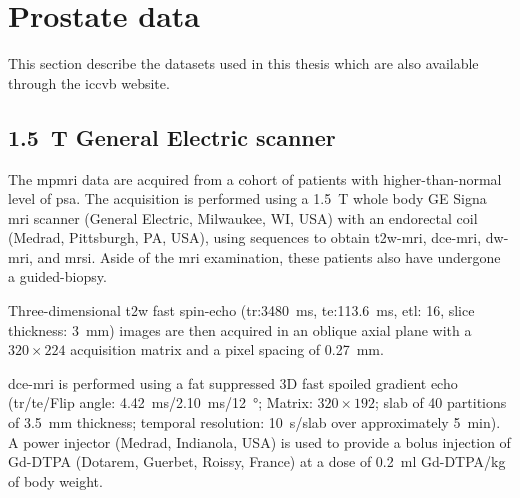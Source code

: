 \section{Prostate data}
This section describe the datasets used in this thesis which are also available through the \acs{iccvb} website.

\subsection{\SI{1.5}{\tesla} General Electric scanner}

The \ac{mpmri} data are acquired from a cohort of patients with higher-than-normal level of \ac{psa}.
The acquisition is performed using a \SI{1.5}{\tesla} whole body GE Signa \ac{mri} scanner (General Electric, Milwaukee, WI, USA) with an endorectal coil (Medrad, Pittsburgh, PA, USA), using sequences to obtain \ac{t2w}-\ac{mri}, \ac{dce}-\ac{mri}, \ac{dw}-\ac{mri}, and \ac{mrsi}.
Aside of the \ac{mri} examination, these patients also have undergone a guided-biopsy.

Three-dimensional \ac{t2w} fast spin-echo (\ac{tr}:\SI{3480}{\ms}, \ac{te}:\SI{113.6}{\ms}, \ac{etl}: 16, slice thickness: \SI{3}{\mm}) images are then acquired in an oblique axial plane with a  $320 \times 224$ acquisition matrix and a pixel spacing of \SI{0.27}{\milli\metre}.


\ac{dce}-\ac{mri} is performed using a fat suppressed 3D fast spoiled gradient echo (\ac{tr}/\ac{te}/Flip angle: \SI{4.42}{\ms}/\SI{2.10}{\ms}/\SI{12}{\degree}; Matrix: $320 \times 192$; slab of 40 partitions of \SI{3.5}{\mm} thickness; temporal resolution: \SI{10}{\s}/slab over approximately \SI{5}{\minute}).
A power injector (Medrad, Indianola, USA) is used to provide a bolus injection of Gd-DTPA (Dotarem, Guerbet, Roissy, France) at a dose of \SI{0.2}{\ml} Gd-DTPA/kg of body weight.

